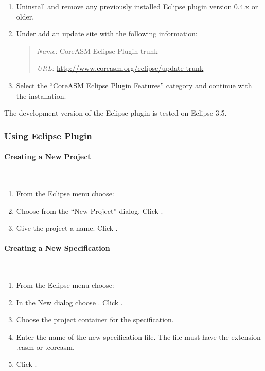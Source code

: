 \documentclass{article}
\renewcommand{\url}[1]{\href{http://#1}{{\ttfamily #1}}}
\begin{document}
\begin{enumerate}
    \item Uninstall and remove any previously installed \CoreASM Eclipse plugin version 0.4.x or older.
    
	\item Under  add an update site with the following information:
	\begin{quote}
        {\em Name:} CoreASM Eclipse Plugin trunk

        {\em URL:} \url{http://www.coreasm.org/eclipse/update-trunk}
	\end{quote}
	
	\item Select the ``CoreASM Eclipse Plugin Features'' category and continue with the installation. 
\end{enumerate}

The development version of the \CoreASM Eclipse plugin is tested on Eclipse 3.5.

\subsubsection{Using \CoreASM Eclipse Plugin}

\paragraph{Creating a New Project} ~

\begin{enumerate}
    \item From the Eclipse menu choose: 
    \item Choose  from the ``New Project'' dialog. Click .
    \item Give the project a name. Click . 
\end{enumerate}

\paragraph{Creating a New \CoreASM Specification} ~


\begin{enumerate}
	\item From the Eclipse menu choose: 
	\item In the New dialog choose . Click .
    \item Choose the project container for the specification.
    \item Enter the name of the new \CoreASM specification file. The file must have the extension {\ttfamily .casm} or {\ttfamily .coreasm}. 
	\item Click . 
\end{enumerate}
\end{document}
